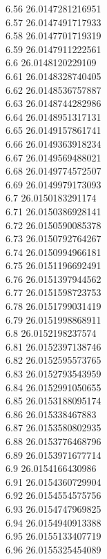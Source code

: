 {6.56	26.0147281216951\\
6.57	26.0147491717933\\
6.58	26.0147701719319\\
6.59	26.0147911222561\\
6.6	26.0148120229109\\
6.61	26.0148328740405\\
6.62	26.0148536757887\\
6.63	26.0148744282986\\
6.64	26.0148951317131\\
6.65	26.0149157861741\\
6.66	26.0149363918234\\
6.67	26.0149569488021\\
6.68	26.0149774572507\\
6.69	26.0149979173093\\
6.7	26.0150183291174\\
6.71	26.0150386928141\\
6.72	26.0150590085378\\
6.73	26.0150792764267\\
6.74	26.0150994966181\\
6.75	26.0151196692491\\
6.76	26.0151397944562\\
6.77	26.0151598723753\\
6.78	26.0151799031419\\
6.79	26.0151998868911\\
6.8	26.0152198237574\\
6.81	26.0152397138746\\
6.82	26.0152595573765\\
6.83	26.0152793543959\\
6.84	26.0152991050655\\
6.85	26.0153188095174\\
6.86	26.015338467883\\
6.87	26.0153580802935\\
6.88	26.0153776468796\\
6.89	26.0153971677714\\
6.9	26.0154166430986\\
6.91	26.0154360729904\\
6.92	26.0154554575756\\
6.93	26.0154747969825\\
6.94	26.0154940913388\\
6.95	26.0155133407719\\
6.96	26.0155325454089\\
}
